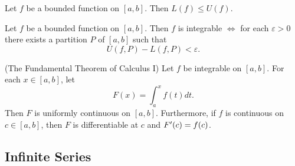 \documentclass[12pt]{article}
\begin{document}
\begin{theorem}
  Let $f$ be a bounded function on $[a,b]$. Then $L(f) \le U(f)$.
\end{theorem}

\begin{theorem}
  Let $f$ be a bounded function on $[a,b]$. Then $f$ is integrable $\iff$ for
  each $\varepsilon > 0$ there exists a partition $P$ of $[a,b]$ such that $$U(f, P) -
  L(f, P) < \varepsilon.$$
\end{theorem}

\begin{theorem}
(The Fundamental Theorem of Calculus I) Let $f$ be integrable on $[a,b]$. For
each $x \in [a,b]$, let $$F(x) = \int_a^x f(t) dt.$$ Then $F$ is uniformly
continuous on $[a,b]$. Furthermore, if $f$ is continuous on $c \in [a,b]$, then
$F$ is differentiable at $c$ and $F'(c) = f(c)$.
\end{theorem}

\subsection{Infinite Series}
\label{sec:org0399c08}
\end{document}
